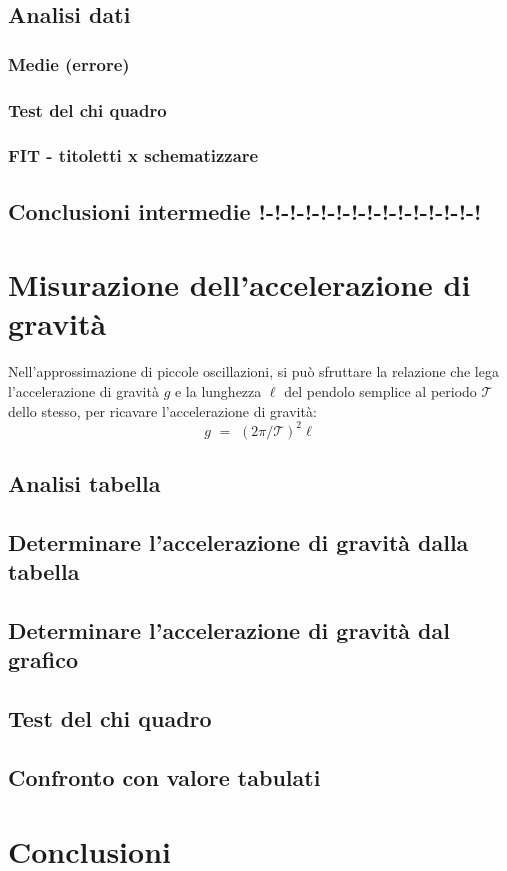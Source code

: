 \documentclass[11pt, twoside, a4paper]{article}
\begin{document}
	\subsection{Analisi dati}
		\subsubsection{Medie (errore)}
		
		\subsubsection{Test del chi quadro}
		
		\subsubsection{FIT - titoletti x schematizzare}
		
	\subsection{Conclusioni intermedie !-!-!-!-!-!-!-!-!-!-!-!-!-!-!}
	
\newpage
\section{Misurazione dell'accelerazione di gravità}
%
Nell'approssimazione di piccole oscillazioni, si può sfruttare la relazione che lega l'accelerazione di gravità $g$ e la lunghezza $\ell$ del pendolo semplice al periodo $\mathcal{T}$ dello stesso, per ricavare l'accelerazione di gravità:
\begin{equation}
	g \,\, = \,\, (2 \pi / \mathcal{T})^2 \ell
\end{equation}
	\subsection{Analisi tabella}
	
	\subsection{Determinare l'accelerazione di gravità dalla tabella}
	
	\subsection{Determinare l'accelerazione di gravità dal grafico}
	
	\subsection{Test del chi quadro}
	
	\subsection{Confronto con valore tabulati}
	

\newpage
\section{Conclusioni}

\end{document}
